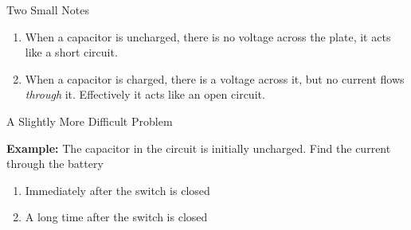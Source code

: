 \documentclass[12pt,aspectratio=169]{beamer}
\begin{document}
\begin{frame}{Two Small Notes}
  \begin{enumerate}
  \item When a capacitor is uncharged, there is no voltage across the plate,
    it acts like a short circuit.
  \item When a capacitor is charged, there is a voltage across it, but no
    current flows \emph{through} it. Effectively it acts like an open circuit.
  \end{enumerate}
\end{frame}



\begin{frame}{A Slightly More Difficult Problem}
  \begin{center}
  \end{center}
  \textbf{Example:} The capacitor in the circuit is initially uncharged. Find
  the current through the battery
  \begin{enumerate}
  \item Immediately after the switch is closed
  \item A long time after the switch is closed
  \end{enumerate}
\end{frame}
\end{document}
